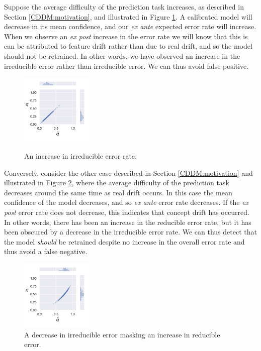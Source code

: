 Suppose the average difficulty of the prediction task increases, as described in Section \ref{CDDM:motivation}, and illustrated in Figure \ref{fig:pos_virt}. A calibrated model will decrease in its mean confidence, and our {\it ex  ante} expected error rate will increase. When we observe an {\it ex post} increase in the error rate we will know that this is can be attributed to feature drift rather than due to real drift, and so the model should not be retrained. In other words, we have observed an increase in the irreducible error rather than irreducible error. We can thus avoid false positive.

\begin{figure}
    \centering
    \includegraphics[width=0.3\textwidth]{images/positive_virtual.pdf}
    \label{fig:pos_virt}
    \caption{An increase in irreducible error rate.}
\end{figure}

Conversely, consider the other case described in Section \ref{CDDM:motivation} and illustrated in Figure \ref{fig:co_drift}, where the average difficulty of the prediction task decreases around the same time as real drift occurs. In this case the mean confidence of the model decreases, and so {\it ex ante} error rate decreases. If the {\it ex post} error rate does not decrease, this indicates that concept drift has occurred. In other words, there has been an increase in the reducible error rate, but it has been obscured by a decrease in the irreducible error rate. We can thus detect that the model {\it should} be retrained despite no increase in the overall error rate and thus avoid a false negative.

\begin{figure}
    \centering
        \includegraphics[width=0.3\textwidth]{images/hidden_drift.pdf}
    \caption{A decrease in irreducible error masking an increase in reducible error.}
    \label{fig:co_drift}
\end{figure}

